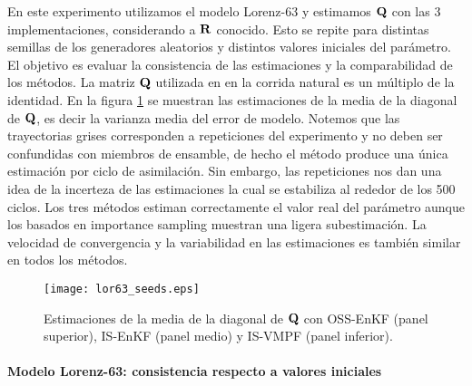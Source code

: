 En este experimento utilizamos el modelo Lorenz-63 y estimamos $\mathbf{Q}$ con las 3 implementaciones, considerando a $\mathbf{R}$ conocido. Esto se repite para distintas semillas de los generadores aleatorios y distintos valores iniciales del parámetro. El objetivo es evaluar la consistencia de las estimaciones y la comparabilidad de los métodos. La matriz $\mathbf{Q}$ utilizada en en la corrida natural es un múltiplo de la identidad. En la figura \ref{fig:lor63_seeds} se muestran las estimaciones de la media de la diagonal de $\mathbf{Q}$, es decir la varianza media del error de modelo. Notemos que las trayectorias grises corresponden a repeticiones del experimento y no deben ser confundidas con miembros de ensamble, de hecho el método produce una única estimación por ciclo de asimilación. Sin embargo, las repeticiones nos dan una idea de la incerteza de las estimaciones la cual se estabiliza al rededor de los 500 ciclos. Los tres métodos estiman correctamente el valor real del parámetro aunque los basados en importance sampling muestran una ligera subestimación. La velocidad de convergencia y la variabilidad en las estimaciones es también similar en todos los métodos.
\begin{figure}[h]
    \centering
    \texttt{[image: lor63\_seeds.eps]}
    \caption{Estimaciones de la media de la diagonal de $\mathbf{Q}$ con OSS-EnKF (panel superior), IS-EnKF (panel medio) y IS-VMPF (panel inferior).}
    \label{fig:lor63_seeds}
\end{figure}

\paragraph{Modelo Lorenz-63: consistencia respecto a valores iniciales} \

